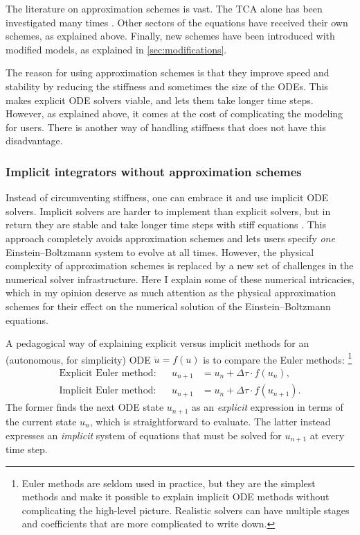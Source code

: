 \documentclass[USenglish, thumbmarks]{uiophdthesis} %
\newcommand\EB{Einstein--Boltzmann}
\begin{document}
The literature on approximation schemes is vast.
The TCA alone has been investigated many times
\cite[e.g.][]{doranSpeedingCosmologicalBoltzmann2005b,cyr-racinePhotonsBaryonsAtoms2011a,pitrouTightcouplingApproximationBaryon2011,blasCosmicLinearAnisotropy2011c,pookkillathBaryonPhysicsTight2019}.
Other sectors of the equations have received their own schemes, as explained above.
Finally, new schemes have been introduced with modified models, as explained in \cref{sec:modifications}.

The reason for using approximation schemes is that they improve speed and stability
by reducing the stiffness and sometimes the size of the ODEs.
This makes explicit ODE solvers viable,
and lets them take longer time steps.
However, as explained above, it comes at the cost of complicating the modeling for users.
There is another way of handling stiffness that does not have this disadvantage.

\subsubsection{Implicit integrators without approximation schemes}

Instead of circumventing stiffness,
one can embrace it and use implicit ODE solvers.
Implicit solvers are harder to implement than explicit solvers,
but in return they are stable and take longer time steps with stiff equations \cite[e.g.][]{hairerSolvingOrdinaryDifferential1996}.
This approach completely avoids approximation schemes and lets users specify \emph{one} \EB{} system to evolve at all times.
However, the physical complexity of approximation schemes is replaced
by a new set of challenges in the numerical solver infrastructure.
Here I explain some of these numerical intricacies,
which in my opinion deserve as much attention as the physical approximation schemes
for their effect on the numerical solution of the \EB{} equations.

A pedagogical way of explaining explicit versus implicit methods
for an (autonomous, for simplicity) ODE $\dot{u} = f(u)$
is to compare the Euler methods:%
\footnote{Euler methods are seldom used in practice,
but they are the simplest methods and make it possible to explain implicit ODE methods
without complicating the high-level picture.
Realistic solvers can have multiple stages and coefficients that are more complicated to write down.}%
\begin{subequations}
\label{eq:euler_methods}
\begin{align}
\text{Explicit Euler method:} && u_{n+1} &= u_n + \Delta\tau \cdot f(u_{n  }) \label{eq:euler_explicit}, \\
\text{Implicit Euler method:} && u_{n+1} &= u_n + \Delta\tau \cdot f(u_{n+1}) \label{eq:euler_implicit}.
\end{align}
\end{subequations}
The former finds the next ODE state $u_{n+1}$ as an \emph{explicit} expression in terms of the current state $u_{n}$,
which is straightforward to evaluate.
The latter instead expresses an \emph{implicit} system of equations that must be solved for $u_{n+1}$ at every time step.
\end{document}

